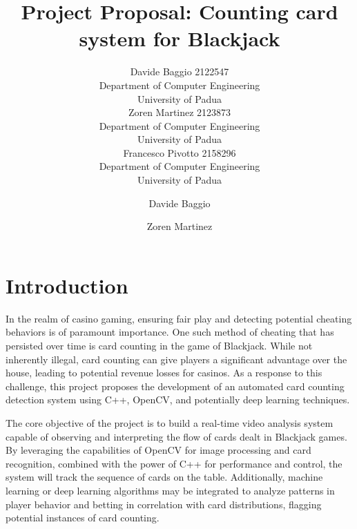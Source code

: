 \documentclass{article}
\title{Project Proposal: Counting card system for Blackjack}
\date{}
\author{{\hspace{1mm}Davide Baggio 2122547} \\
	Department of Computer Engineering\\
	University of Padua\\
	\And
	{\hspace{1mm}Zoren Martinez 2123873} \\
	Department of Computer Engineering\\
	University of Padua\\
	\And
	{\hspace{1mm}Francesco Pivotto 2158296} \\
	Department of Computer Engineering\\
	University of Padua\\
}
\author[1]{%
	{\usebox{\orcid}\hspace{1mm}Davide Baggio}
}
\author[1,2]{%
	{\usebox{\orcid}\hspace{1mm}Zoren Martinez}
}
\affil[1]{Department of Computer Engineering, University of Padua}
\affil[2]{Department of Computer Engineering, University of Padua}
\begin{document}
\maketitle





\section*{Introduction}

In the realm of casino gaming, ensuring fair play and detecting potential cheating behaviors is of paramount importance. One such method of cheating that has persisted over time is card counting in the game of Blackjack. While not inherently illegal, card counting can give players a significant advantage over the house, leading to potential revenue losses for casinos. As a response to this challenge, this project proposes the development of an automated card counting detection system using C++, OpenCV, and potentially deep learning techniques.

The core objective of the project is to build a real-time video analysis system capable of observing and interpreting the flow of cards dealt in Blackjack games. By leveraging the capabilities of OpenCV for image processing and card recognition, combined with the power of C++ for performance and control, the system will track the sequence of cards on the table. Additionally, machine learning or deep learning algorithms may be integrated to analyze patterns in player behavior and betting in correlation with card distributions, flagging potential instances of card counting.
\end{document}

